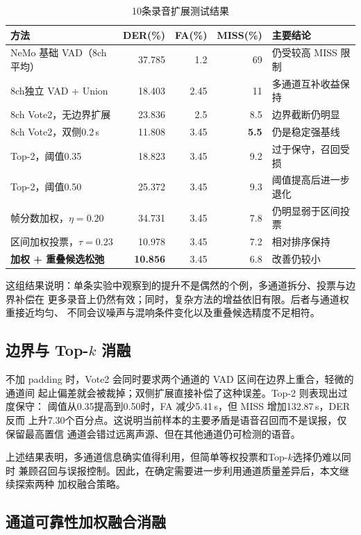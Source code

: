 \documentclass[UTF8,a4paper,10pt]{ctexart}
\begin{document}
\begin{table}[H]
\centering
\small
\caption{10条录音扩展测试结果}
\label{tab:tenrecordings-detail}
\begin{tabular}{lrrrl}
\toprule
方法 & DER(\%) & FA(\%) & MISS(\%) & 主要结论\\
\midrule
NeMo 基础 VAD（8ch平均） & 37.785 & 1.2 & 69 & 仍受较高 MISS 限制\\
8ch独立 VAD + Union & 18.403 & 2.45 & 11 & 多通道互补收益保持\\
8ch Vote2，无边界扩展 & 23.836 & 2.5 & 8.5 & 边界截断仍明显\\
8ch Vote2，双侧0.2\,s & 11.808 & 3.45 & \textbf{5.5} & 仍是稳定强基线\\
Top-2，阈值0.35 & 18.823 & 3.45 & 9.2 & 过于保守，召回受损\\
Top-2，阈值0.50 & 25.372 & 3.45 & 9.3 & 阈值提高后进一步退化\\
帧分数加权，$\eta=0.20$ & 34.731 & 3.45 & 7.8 & 仍明显弱于区间投票\\
区间加权投票，$\tau=0.23$ & 10.978 & 3.45 & 7.2 & 相对排序保持\\
\textbf{加权 + 重叠候选松弛} & \textbf{10.856} & 3.45 & 6.8 & 改善仍较小\\
\bottomrule
\end{tabular}
\end{table}

这组结果说明：单条实验中观察到的提升不是偶然的个例，多通道拆分、投票与边界补偿在
更多录音上仍然有效；同时，复杂方法的增益依旧有限。后者与通道权重接近均匀、
不同会议噪声与混响条件变化以及重叠候选精度不足相符。

\subsection{边界与 Top-$k$ 消融}

不加 padding 时，Vote2 会同时要求两个通道的 VAD 区间在边界上重合，轻微的通道间
起止偏差就会被裁掉；双侧扩展直接补偿了这种误差。Top-2 则表现出过度保守：
阈值从0.35提高到0.50时，FA 减少5.41\,s，但 MISS 增加132.87\,s，DER 反而
上升7.30个百分点。这说明当前样本的主要矛盾是语音召回而不是误报，仅保留最高置信
通道会错过远离声源、但在其他通道仍可检测的语音。

上述结果表明，多通道信息确实值得利用，但简单等权投票和Top-$k$选择仍难以同时
兼顾召回与误报控制。因此，在确定需要进一步利用通道质量差异后，本文继续探索两种
加权融合策略。

\subsection{通道可靠性加权融合消融}
\end{document}
